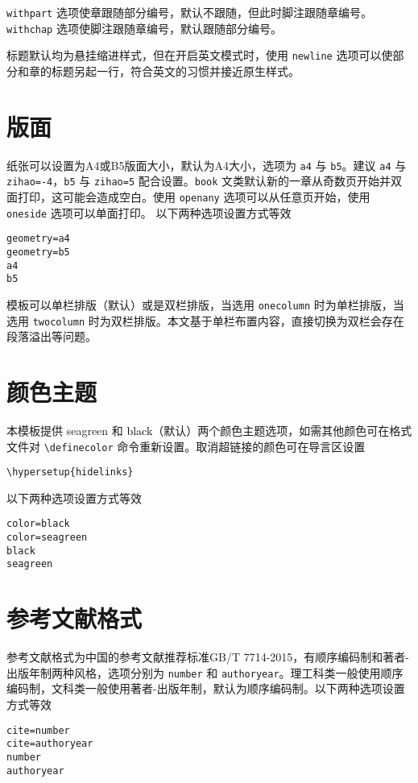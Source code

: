\lstinline{withpart} 选项使\textsf{章}跟随\textsf{部分}编号，默认不跟随，但此时\textsf{脚注}跟随\textsf{章}编号。\lstinline{withchap} 选项使\textsf{脚注}跟随\textsf{章}编号，默认跟随\textsf{部分}编号。

标题默认均为悬挂缩进样式，但在开启英文模式时，使用 \lstinline{newline} 选项可以使\textsf{部分}和\textsf{章}的标题另起一行，符合英文的习惯并接近原生样式。

\section{版面}
纸张可以设置为A4或B5版面大小，默认为A4大小，选项为 \lstinline{a4} 与 \lstinline{b5}。建议 \lstinline{a4} 与 \lstinline{zihao=-4}，\lstinline{b5} 与 \lstinline{zihao=5} 配合设置。\lstinline{book} 文类默认新的一章从奇数页开始并双面打印，这可能会造成空白。使用 \lstinline{openany} 选项可以从任意页开始，使用 \lstinline{oneside} 选项可以单面打印。
以下两种选项设置方式等效
\begin{lstlisting}[numbers=none]
geometry=a4
geometry=b5
a4
b5
\end{lstlisting}

模板可以单栏排版（默认）或是双栏排版，当选用 \lstinline{onecolumn} 时为单栏排版，当选用 \lstinline{twocolumn} 时为双栏排版。本文基于单栏布置内容，直接切换为双栏会存在段落溢出等问题。

\section{颜色主题}
本模板提供 \textsf{\textcolor{frame}{seagreen}} 和 \textsf{\textcolor{black}{black}}（默认）两个颜色主题选项，如需其他颜色可在格式文件对 \lstinline{\definecolor} 命令重新设置。取消超链接的颜色可在导言区设置
\begin{lstlisting}[numbers=none]
\hypersetup{hidelinks}
\end{lstlisting}
以下两种选项设置方式等效
\begin{lstlisting}[numbers=none]
color=black
color=seagreen
black
seagreen
\end{lstlisting}

\section{参考文献格式}
参考文献格式为中国的参考文献推荐标准GB/T 7714-2015，有顺序编码制和著者-出版年制两种风格，选项分别为 \lstinline{number} 和 \lstinline{authoryear}。理工科类一般使用顺序编码制，文科类一般使用著者-出版年制，默认为顺序编码制。以下两种选项设置方式等效
\begin{lstlisting}[numbers=none]
cite=number
cite=authoryear
number
authoryear
\end{lstlisting}

